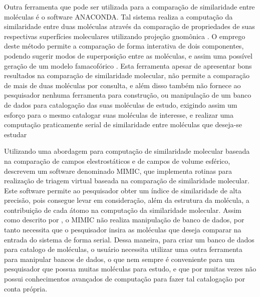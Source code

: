 Outra ferramenta que pode ser utilizada para a comparação de similaridade entre moléculas é o software ANACONDA. Tal sistema realiza a computação da similaridade entre duas moléculas através da comparação de propriedades de suas respectivas superfícies moleculares utilizando projeção gnomônica . O emprego deste método permite	 a comparação de forma interativa de dois componentes, podendo sugerir modos de superposição entre as moléculas, e assim uma possível geração de um modelo famacofórico \cite{devillers1996}. Esta ferramenta apesar de apresentar bons resultados na comparação de similaridade molecular, não permite a comparação de mais de duas moléculas por consulta, e além disso também não fornece ao pesquisador nenhuma ferramenta para construção, ou manipulação de um banco de dados para catalogação das suas moléculas de estudo, exigindo assim um esforço para o mesmo catalogar suas moléculas de interesse, e realizar uma computação praticamente serial de similaridade entre moléculas que deseja-se estudar 

Utilizando uma abordagem para computação de similaridade molecular baseada na comparação de campos elestrostáticos e de campos de volume esférico, \cite{mestres1997mimic} descrevem um software denominado MIMIC, que implementa rotinas para realização de triagem virtual baseada na comparação de similaridade molecular. Este software permite ao pesquisador obter um índice de similaridade de alta precisão, pois consegue levar em consideração, além da estrutura da molécula, a contribuição de cada átomo na computação da similaridade molecular. Assim como descrito por \cite{devillers1996}, o MIMIC não realiza manipulação de banco de dados, por tanto necessita que o pesquisador insira as moléculas que deseja comparar na entrada do sistema de forma serial. Dessa maneira, para criar um banco de dados para catalogo de moléculas, o usuário necessita utilizar uma outra ferramenta para manipular bancos de dados, o que nem sempre é conveniente para um pesquisador que possua muitas moléculas para estudo, e que por muitas vezes não possui conhecimentos avançados de computação para fazer tal catalogação por conta própria.

